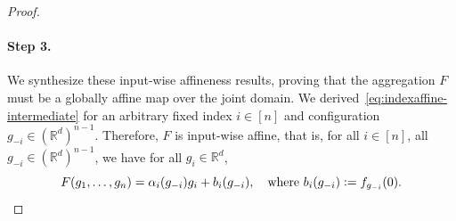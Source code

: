 \documentclass[twoside,11pt]{article}
\newcommand{\R}{\mathbb{R}}
\begin{document}
\begin{proof}
    \paragraph{Step 3.} We synthesize these input-wise affineness results, proving that the aggregation $F$ must be a globally affine map over the joint domain.
    We derived~\eqref{eq:indexaffine-intermediate} for an arbitrary fixed index $i\in[n]$ and configuration $g_{-i} \in (\R^d)^{n-1}$.
    Therefore, $F$ is input-wise affine, that is, for all $i \in [n]$, all $g_{-i} \in (\R^d)^{n-1}$, we have for all $g_i \in \R^d$,
    \begin{equation}\label{eq:indexaffine}
        F(g_1, \ldots, g_n) = \alpha_i (g_{-i}) g_i + b_i(g_{-i}),
        \quad \text{where } b_i(g_{-i}) \vcentcolon= f_{g_{-i}}(0).
    \end{equation}


\end{proof}
\end{document}
